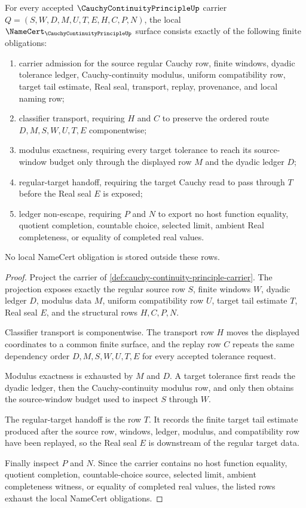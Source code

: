 \begin{theorem}
\label{thm:cauchy-continuity-principle-namecert-obligations}
For every accepted $\CauchyContinuityPrincipleUp$ carrier $Q=(S,W,D,M,U,T,E,H,C,P,N)$, the local $\NameCert_{\CauchyContinuityPrincipleUp}$ surface consists exactly of the following finite obligations:
\begin{enumerate}
\item carrier admission for the source regular Cauchy row, finite windows, dyadic tolerance ledger, Cauchy-continuity modulus, uniform compatibility row, target tail estimate, Real seal, transport, replay, provenance, and local naming row;
\item classifier transport, requiring $H$ and $C$ to preserve the ordered route $D,M,S,W,U,T,E$ componentwise;
\item modulus exactness, requiring every target tolerance to reach its source-window budget only through the displayed row $M$ and the dyadic ledger $D$;
\item regular-target handoff, requiring the target Cauchy read to pass through $T$ before the Real seal $E$ is exposed;
\item ledger non-escape, requiring $P$ and $N$ to export no host function equality, quotient completion, countable choice, selected limit, ambient Real completeness, or equality of completed real values.
\end{enumerate}
No local NameCert obligation is stored outside these rows.
\end{theorem}
\begin{proof}
Project the carrier of \autoref{def:cauchy-continuity-principle-carrier}. The projection exposes exactly the regular source row $S$, finite windows $W$, dyadic ledger $D$, modulus data $M$, uniform compatibility row $U$, target tail estimate $T$, Real seal $E$, and the structural rows $H,C,P,N$.

Classifier transport is componentwise. The transport row $H$ moves the displayed coordinates to a common finite surface, and the replay row $C$ repeats the same dependency order $D,M,S,W,U,T,E$ for every accepted tolerance request.

Modulus exactness is exhausted by $M$ and $D$. A target tolerance first reads the dyadic ledger, then the Cauchy-continuity modulus row, and only then obtains the source-window budget used to inspect $S$ through $W$.

The regular-target handoff is the row $T$. It records the finite target tail estimate produced after the source row, windows, ledger, modulus, and compatibility row have been replayed, so the Real seal $E$ is downstream of the regular target data.

Finally inspect $P$ and $N$. Since the carrier contains no host function equality, quotient completion, countable-choice source, selected limit, ambient completeness witness, or equality of completed real values, the listed rows exhaust the local NameCert obligations.
\end{proof}

